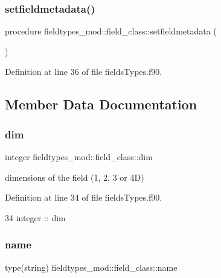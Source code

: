 \subsubsection{\texorpdfstring{setfieldmetadata()}{setfieldmetadata()}}
{\footnotesize\ttfamily procedure fieldtypes\+\_\+mod\+::field\+\_\+class\+::setfieldmetadata (\begin{DoxyParamCaption}{ }\end{DoxyParamCaption})\hspace{0.3cm}{\ttfamily [private]}}



Definition at line 36 of file fields\+Types.\+f90.



\subsection{Member Data Documentation}
\mbox{\label{structfieldtypes__mod_1_1field__class_a46ac561c9acc61595c7e15d30a56794e}} 
\subsubsection{\texorpdfstring{dim}{dim}}
{\footnotesize\ttfamily integer fieldtypes\+\_\+mod\+::field\+\_\+class\+::dim\hspace{0.3cm}{\ttfamily [private]}}



dimensions of the field (1, 2, 3 or 4D) 



Definition at line 34 of file fields\+Types.\+f90.


\begin{DoxyCode}
34         \textcolor{keywordtype}{integer} :: dim
\end{DoxyCode}
\mbox{\label{structfieldtypes__mod_1_1field__class_a0482789d206fc831b81c99daa17069d3}} 
\subsubsection{\texorpdfstring{name}{name}}
{\footnotesize\ttfamily type(string) fieldtypes\+\_\+mod\+::field\+\_\+class\+::name\hspace{0.3cm}{\ttfamily [private]}}



